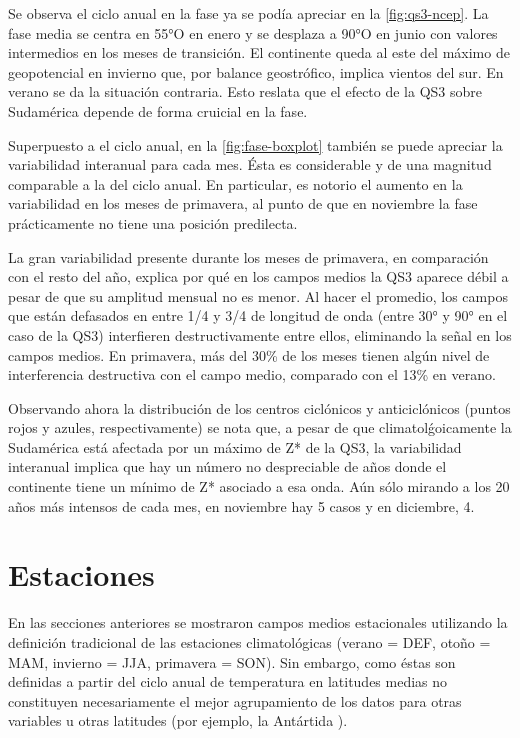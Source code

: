 \documentclass[spanish,a4paper,12p]{book}
\begin{document}
Se observa el ciclo anual en la fase ya se podía apreciar en la
\autoref{fig:qs3-ncep}. La fase media se centra en 55°O en enero y se
desplaza a 90°O en junio con valores intermedios en los meses de
transición. El continente queda al este del máximo de geopotencial en
invierno que, por balance geostrófico, implica vientos del sur. En
verano se da la situación contraria. Esto reslata que el efecto de la
QS3 sobre Sudamérica depende de forma cruicial en la fase.

Superpuesto a el ciclo anual, en la \autoref{fig:fase-boxplot} también
se puede apreciar la variabilidad interanual para cada mes. Ésta es
considerable y de una magnitud comparable a la del ciclo anual. En
particular, es notorio el aumento en la variabilidad en los meses de
primavera, al punto de que en noviembre la fase prácticamente no tiene
una posición predilecta.

La gran variabilidad presente durante los meses de primavera, en
comparación con el resto del año, explica por qué en los campos medios
la QS3 aparece débil a pesar de que su amplitud mensual no es menor. Al
hacer el promedio, los campos que están defasados en entre 1/4 y 3/4 de
longitud de onda (entre 30° y 90° en el caso de la QS3) interfieren
destructivamente entre ellos, eliminando la señal en los campos medios.
En primavera, más del 30\% de los meses tienen algún nivel de
interferencia destructiva con el campo medio, comparado con el 13\% en
verano.

Observando ahora la distribución de los centros ciclónicos y
anticiclónicos (puntos rojos y azules,
respectivamente)
se nota que, a pesar de que climatolǵoicamente la Sudamérica está
afectada por un máximo de Z* de la QS3, la variabilidad interanual
implica que hay un número no despreciable de años donde el continente
tiene un mínimo de Z* asociado a esa onda. Aún sólo mirando a los 20
años más intensos de cada mes, en noviembre hay 5 casos y en diciembre,
4.

\section{Estaciones}\label{estaciones}

En las secciones anteriores se mostraron campos medios estacionales
utilizando la definición tradicional de las estaciones climatológicas
(verano = DEF, otoño = MAM, invierno = JJA, primavera = SON). Sin
embargo, como éstas son definidas a partir del ciclo anual de
temperatura en latitudes medias no constituyen necesariamente el mejor
agrupamiento de los datos para otras variables u otras latitudes (por
ejemplo, la Antártida ).
\end{document}
